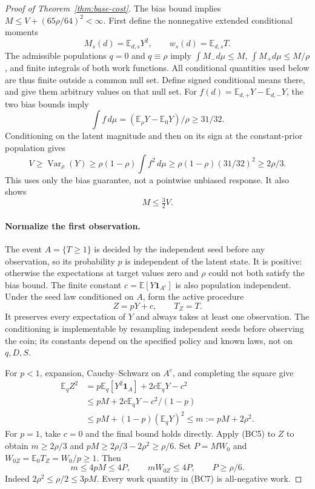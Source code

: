 \documentclass[11pt]{article}
\begin{document}
\begin{proof}[Proof of Theorem~\ref{thm:base-cost}]
The bias bound implies $M\le V+(65\rho/64)^2<\infty$.
First define the nonnegative extended conditional moments
\[
 M_s(d)=\mathbb E_{d,s}Y^2,\qquad w_s(d)=\mathbb E_{d,s}T.
\]
The admissible populations $q=0$ and $q\equiv\rho$ imply
$\int M_-d\mu\le M$, $\int M_+d\mu\le M/\rho$, and finite
integrals of both work functions. All conditional quantities used below
are thus finite outside a common null set. Define signed conditional
means there, and give them arbitrary values on that null set. For
$f(d)=\mathbb E_{d,+}Y-\mathbb E_{d,-}Y$, the two bias bounds imply
\[
 \int f\,d\mu=(\mathbb E_\rho Y-\mathbb E_0Y)/\rho\ge31/32.
\]
Conditioning on the latent magnitude and then on its sign at the
constant-prior population gives
\[
 V\ge\operatorname{Var}_\rho(Y)
 \ge\rho(1-\rho)\int f^2\,d\mu
 \ge\rho(1-\rho)(31/32)^2\ge2\rho/3.                   \tag{BC5}
\]
This uses only the bias guarantee, not a pointwise unbiased response.
It also shows
\[
                        M\le\tfrac32 V.               \tag{BC6}
\]

\paragraph{Normalize the first observation.}
The event $A=\{T\ge1\}$ is decided by the independent seed before any
observation, so its probability $p$ is independent of the latent state.
It is positive: otherwise the expectations at target values zero and
$\rho$ could not both satisfy the bias bound. The finite constant
$c=\mathbb E[Y\mathbf1_{A^c}]$ is also population independent. Under
the seed law conditioned on $A$, form the active procedure
\[
                  Z=pY+c,\qquad T_Z=T.
\]
It preserves every expectation of $Y$ and always takes at least one
observation. The conditioning is implementable by resampling independent
seeds before observing the coin; its constants depend on the specified
policy and known laws, not on $q,D,S$.

For $p<1$, expansion, Cauchy--Schwarz on $A^c$, and completing the square
give
\begin{align*}
 \mathbb E_qZ^2
 &=p\mathbb E_q[Y^2\mathbf1_A]+2c\mathbb E_qY-c^2\\
 &\le pM+2c\mathbb E_qY-c^2/(1-p)\\
 &\le pM+(1-p)(\mathbb E_qY)^2
 \le m:=pM+2\rho^2.
\end{align*}
For $p=1$, take $c=0$ and the final bound holds directly. Apply (BC5) to
$Z$ to obtain $m\ge2\rho/3$ and
$pM\ge2\rho/3-2\rho^2\ge\rho/6$. Set
$P=MW_0$ and $W_{0Z}=\mathbb E_0T_Z=W_0/p\ge1$. Then
\[
 m\le4pM\le4P,\qquad mW_{0Z}\le4P,
 \qquad P\ge\rho/6.                                   \tag{BC7}
\]
Indeed $2\rho^2\le\rho/2\le3pM$. Every work quantity in (BC7) is
all-negative work.


\end{proof}
\end{document}
